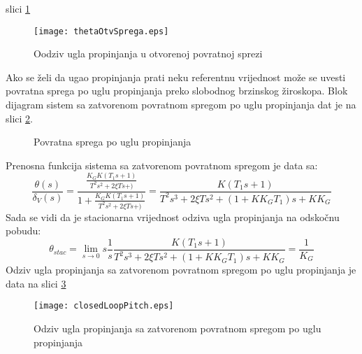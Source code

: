 slici \ref{fig:propinj}
\begin{figure}[!ht]
    \centering
    \texttt{[image: thetaOtvSprega.eps]}
    \caption{Oodziv ugla propinjanja u otvorenoj povratnoj sprezi}
    \label{fig:propinj}
\end{figure} 
Ako se želi da ugao propinjanja prati neku referentnu vrijednost može se uvesti 
povratna sprega po uglu propinjanja preko slobodnog brzinskog žiroskopa. Blok dijagram sistem sa zatvorenom 
povratnom spregom po uglu propinjanja dat je na slici \ref{fig:slobGyro}.
 \begin{figure}[!ht]
     \centering
\caption{Povratna sprega po uglu propinjanja}
\label{fig:slobGyro}
\end{figure}
Prenosna funkcija sistema sa zatvorenom povratnom spregom je data sa:
\begin{equation}
    \frac{\theta (s)}{\delta _V(s)} = \frac{\frac{K_GK(T_1s+1)}{T^2s^2+2\xi Ts+)}}{1+\frac{K_GK(T_1s+1)}{T^2s^2+2\xi Ts+)}}
    =\frac{K(T_1s+1)}{T^2s^3+2\xi Ts^2+(1+KK_GT_1)s+KK_G}
\end{equation}
Sada se vidi da je stacionarna vrijednost odziva ugla propinjanja na odskočnu pobudu:
\begin{equation}
    \theta _{stac} = \lim_{s \to 0} s\frac{1}{s}\frac{K(T_1s+1)}{T^2s^3+2\xi Ts^2+(1+KK_GT_1)s+KK_G} = \frac{1}{K_G}
\end{equation}
Odziv ugla propinjanja sa zatvorenom povratnom spregom po uglu propinjanja je data na slici \ref{fig:closedPitch}
\begin{figure}[!ht]
    \centering 
    \texttt{[image: closedLoopPitch.eps]}
    \caption{Odziv ugla propinjanja sa zatvorenom povratnom spregom po uglu propinjanja}
    \label{fig:closedPitch}
\end{figure}
